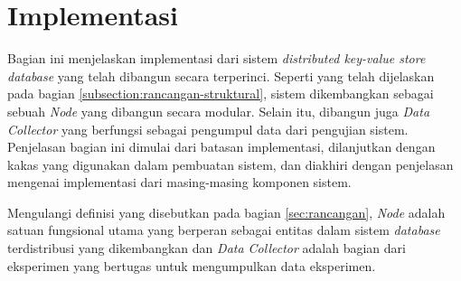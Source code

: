 \section{Implementasi}
\label{sec:implementation}

Bagian ini menjelaskan implementasi dari sistem \textit{distributed key-value store database} yang telah dibangun secara terperinci. Seperti yang telah dijelaskan pada bagian \ref{subsection:rancangan-struktural}, sistem dikembangkan sebagai sebuah \textit{Node} yang dibangun secara modular. Selain itu, dibangun juga \textit{Data Collector} yang berfungsi sebagai pengumpul data dari pengujian sistem. Penjelasan bagian ini dimulai dari batasan implementasi, dilanjutkan dengan kakas yang digunakan dalam pembuatan sistem, dan diakhiri dengan penjelasan mengenai implementasi dari masing-masing komponen sistem.

Mengulangi definisi yang disebutkan pada bagian \ref{sec:rancangan}, \textit{Node} adalah satuan fungsional utama yang berperan sebagai entitas dalam sistem \textit{database} terdistribusi yang dikembangkan dan \textit{Data Collector} adalah bagian dari eksperimen yang bertugas untuk mengumpulkan data eksperimen.






